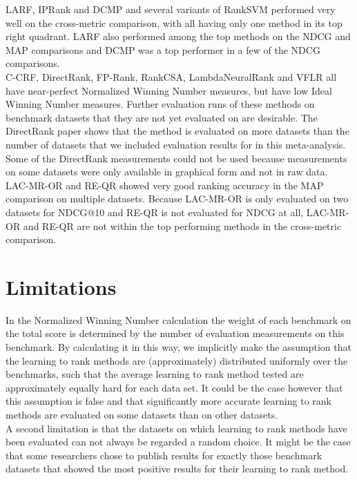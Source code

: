 \documentclass{sig-alternate-2013}
\begin{document}
LARF, IPRank and DCMP and several variants of RankSVM performed very well on the cross-metric comparison, with all having only one method in its top right quadrant. LARF also performed among the top methods on the NDCG and MAP comparisons and DCMP was a top performer in a few of the NDCG comparisons.\\

C-CRF, DirectRank, FP-Rank, RankCSA, LambdaNeuralRank and VFLR all have near-perfect Normalized Winning Number measures, but have low Ideal Winning Number measures. Further evaluation runs of these methods on benchmark datasets that they are not yet evaluated on are desirable. The DirectRank paper \cite{Tan2013} shows that the method  is evaluated on more datasets than the number of datasets that we included evaluation results for in this meta-analysis. Some of the DirectRank measurements could not be used because measurements on some datasets were only available in graphical form and not in raw data.\\

LAC-MR-OR and RE-QR showed very good ranking accuracy in the MAP comparison on multiple datasets. Because LAC-MR-OR is only evaluated on two datasets for NDCG@10 and RE-QR is not evaluated for NDCG at all, LAC-MR-OR and RE-QR are not within the top performing methods in the cross-metric comparison. 

\section{Limitations}
In the Normalized Winning Number calculation the weight of each benchmark on the total score is determined by the number of evaluation measurements on this benchmark. By calculating it in this way, we implicitly make the assumption that the learning to rank methods are (approximately) distributed uniformly over the benchmarks, such that the average learning to rank method tested are approximately equally hard for each data set. It could be the case however that this assumption is false and that significantly more accurate learning to rank methods are evaluated on some datasets than on other datasets. \\

A second limitation is that the datasets on which learning to rank methods have been evaluated can not always be regarded a random choice. It might be the case that some researchers chose to publish results for exactly those benchmark datasets that showed the most positive results for their learning to rank method.\\
\end{document}
